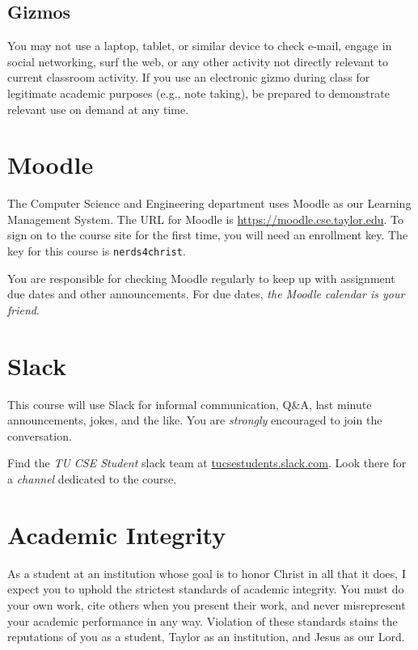 \subsection{Gizmos}

You may not use a laptop, tablet, or similar device to check e-mail, engage in social
networking, surf the web, or any other activity not directly relevant
to current classroom activity.
If you use an electronic gizmo during class for legitimate academic purposes
(e.g., note taking), be prepared to demonstrate relevant use on demand
at any time.

\section{Moodle}

The Computer Science and Engineering department uses Moodle
as our Learning Management System.
The URL for Moodle is \url{https://moodle.cse.taylor.edu}.
To sign on to the course site for the first time,
you will need an enrollment key.
The key for this course is
\texttt{nerds4christ}.

You are responsible for checking Moodle regularly
to keep up with assignment due dates and other announcements.
For due dates, \emph{the Moodle calendar is your friend}.

\section{Slack}

This course will use Slack
for informal communication,
Q\&A,
last minute announcements,
jokes,
and the like.
You are \emph{strongly} encouraged to join the conversation.

Find the \emph{TU CSE Student} slack team at
\url{tucsestudents.slack.com}.
Look there for a \emph{channel}
dedicated to the course.

\section{Academic Integrity}

As a student at an institution whose goal is to honor Christ in all that it does,
I expect you to uphold the strictest standards of academic integrity.
You must do your own work,
cite others when you present their work,
and never misrepresent your academic performance in any way.
Violation of these standards stains the reputations of you as a student,
Taylor as an institution,
and Jesus as our Lord.

